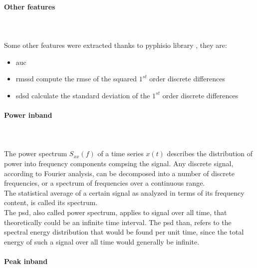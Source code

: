 \paragraph{Other features}
\mbox{} \\ \\
Some other features were extracted thanks to pyphisio library \cite{bizzego2019pyphysio}, they are:
\begin{itemize}
	\item \gls{auc}
	\item \gls{rmssd} compute the \gls{rmse} of the squared $1^{st}$ order discrete differences
	\item \gls{sdsd} calculate the standard deviation of the $1^{st}$ order discrete differences
\end{itemize}

\paragraph{Power inband}
\mbox{} \\ \\
The power spectrum $S_{xx}(f)$ of a time series $x(t)$ describes the distribution of power into frequency components compsing the signal. Any discrete signal, according to Fourier analysis, can be decomposed into a number of discrete frequencies, or a spectrum of frequencies over a continuous range.
\\
The statistical average of a certain signal as analyzed in terms of its frequency content, is called its spectrum.
\\ \indent
The \gls{psd}, also called power spectrum, applies to signal over all time, that theoretically could be an infinite time interval. The \gls{psd} than, refers to the spectral energy distribution that would be found per unit time, since the total energy of such a signal over all time would generally be infinite.




\paragraph{Peak inband}
\mbox{} \\ \\